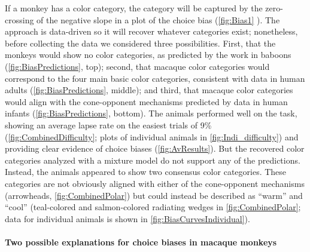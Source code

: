 If a monkey has a color category, the category will be captured by the zero-crossing of the negative slope in a plot of the choice bias (\autoref{fig:Bias1}%
). 
The approach is data-driven so it will recover whatever categories exist; nonetheless, before collecting the data we considered three possibilities. 
First, that the monkeys would show no color categories, as predicted by the work in baboons %
(\autoref{fig:BiasPredictions}, top);
second, that macaque color categories would correspond to the four main basic color categories, consistent with data in human adults %
(\autoref{fig:BiasPredictions}, middle); and third, that macaque color categories would align with the cone-opponent mechanisms predicted by data in human infants%
(\autoref{fig:BiasPredictions}, bottom). 
The animals performed well on the task, showing an average lapse rate on the easiest trials of 9\% (\autoref{fig:CombinedDifficulty}; plots of individual animals in \autoref{fig:Indi_difficulty}) and providing clear evidence of choice biases (\autoref{fig:AvResults}).
But the recovered color categories analyzed with a mixture model do not support any of the predictions. 
Instead, the animals appeared to show two consensus color categories. 
These categories are not obviously aligned with either of the cone-opponent mechanisms (arrowheads, \autoref{fig:CombinedPolar}) but could instead be described as “warm” and “cool” (teal-colored and salmon-colored radiating wedges in \autoref{fig:CombinedPolar}; data for individual animals is shown in \autoref{fig:BiasCurvesIndividual}).

\paragraph{Two possible explanations for choice biases in macaque monkeys}

